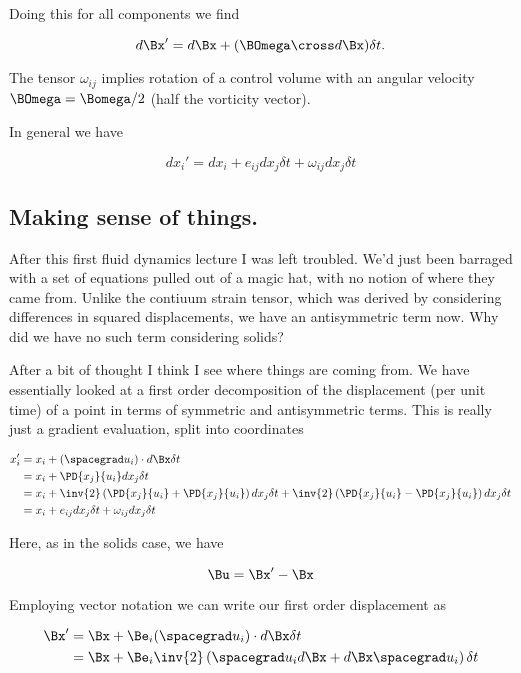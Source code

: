 Doing this for all components we find

\begin{equation}\label{eqn:continuumL8:430}
d\Bx' = d\Bx + (\BOmega \cross d\Bx) \delta t.
\end{equation}

The tensor $\omega_{ij}$ implies rotation of a control volume with an angular velocity $\BOmega = \Bomega/2$ (half the vorticity vector).

In general we have

\begin{equation}\label{eqn:continuumL8:450}
dx_i' = dx_i + e_{ij} dx_j \delta t + \omega_{ij} dx_j \delta t
\end{equation}

\subsection{Making sense of things.}

After this first fluid dynamics lecture I was left troubled.  We'd just been barraged with a set of equations pulled out of a magic hat, with no notion of where they came from.  Unlike the contiuum strain tensor, which was derived by considering differences in squared displacements, we have an antisymmetric term now.  Why did we have no such term considering solids?

After a bit of thought I think I see where things are coming from.  We have essentially looked at a first order decomposition of the displacement (per unit time) of a point in terms of symmetric and antisymmetric terms.  This is really just a gradient evaluation, split into coordinates

\begin{align*}
x_i' 
&= x_i + (\spacegrad u_i) \cdot d\Bx \delta t \\
&= x_i + \PD{x_j}{u_i} dx_j \delta t \\
&= x_i + 
\inv{2}
\left(\PD{x_j}{u_i} 
+\PD{x_j}{u_i} 
\right)
dx_j \delta t 
+
\inv{2}
\left(\PD{x_j}{u_i} 
-\PD{x_j}{u_i} 
\right)
dx_j \delta t  \\
&=
x_i + e_{ij} dx_j \delta t + \omega_{ij} dx_j \delta t
\end{align*}

Here, as in the solids case, we have

\begin{equation}\label{eqn:continuumL8:n}
\Bu = \Bx' - \Bx
\end{equation}

Employing vector notation we can write our first order displacement as

\begin{align*}
\Bx' 
&= \Bx + \Be_i (\spacegrad u_i) \cdot d\Bx \delta t \\
&= \Bx + \Be_i \inv{2}
\left(
\spacegrad u_i d\Bx
+d\Bx
\spacegrad u_i
\right)
\delta t
\end{align*}

\EndArticle

